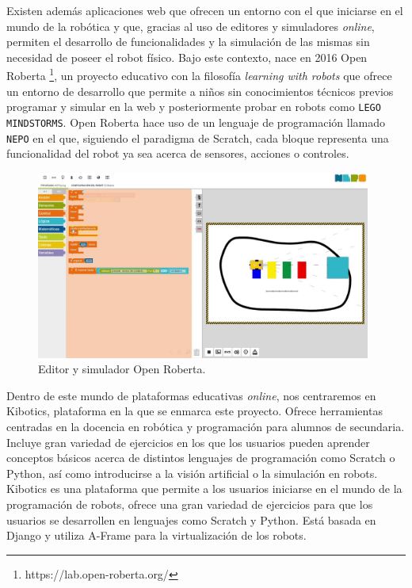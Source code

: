 \documentclass[a4paper, 12pt]{book}
\begin{document}
		Existen además aplicaciones web que ofrecen un entorno con el que iniciarse en el mundo de la robótica y que, gracias al uso de editores y simuladores \textit{online}, permiten el desarrollo de funcionalidades y la simulación de las mismas sin necesidad de poseer el robot físico. Bajo este contexto, nace en 2016 Open Roberta \footnote{https://lab.open-roberta.org/}, un proyecto educativo con la filosofía \textit{learning with robots} que ofrece un entorno de desarrollo que permite a niños sin conocimientos técnicos previos programar y simular en la web y posteriormente probar en robots como \texttt{LEGO MINDSTORMS}. Open Roberta hace uso de un lenguaje de programación llamado \texttt{NEPO} en el que, siguiendo el paradigma de Scratch, cada bloque representa una funcionalidad del robot ya sea acerca de sensores, acciones o controles. \\
		
		\begin{figure}[H]
			\centering
			\includegraphics[width=11cm, keepaspectratio]{img/open_roberta.jpg}
			\caption{Editor y simulador Open Roberta.}
			\label{fig:open_roberta}
		\end{figure}
		
		Dentro de este mundo de plataformas educativas \textit{online}, nos centraremos en Kibotics, plataforma en la que se enmarca este proyecto. Ofrece herramientas centradas en la docencia en robótica y programación para alumnos de secundaria. Incluye gran variedad de ejercicios en los que los usuarios pueden aprender conceptos básicos acerca de distintos lenguajes de programación como Scratch o Python, así como introducirse a la visión artificial o la simulación en robots. Kibotics es una plataforma que permite a los usuarios iniciarse en el mundo de la programación de robots, ofrece una gran variedad de ejercicios para que los usuarios se desarrollen en lenguajes como Scratch y Python. Está basada en Django y utiliza A-Frame para la virtualización de los robots.\\
		
\end{document}
